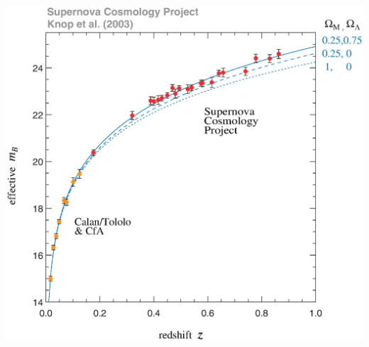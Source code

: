 \documentclass[12pt]{article}
\begin{document}
\begin{minipage}{\linewidth}
  \vspace{1 cm}
  \hspace{-2 cm} \includegraphics[width=1.15\linewidth]{scp_hubblediag.eps} \hspace{-2 cm} 
\end{minipage}

\pagebreak
\end{document}

